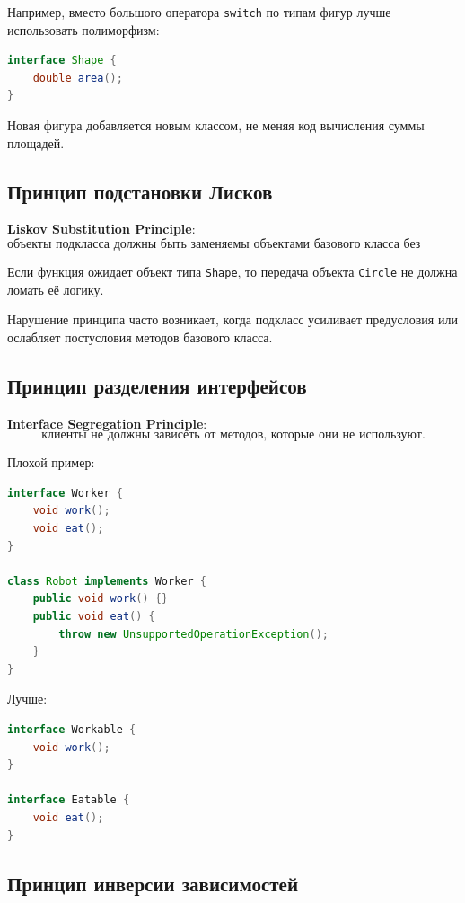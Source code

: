 \documentclass[12pt,a4paper]{article}
\begin{document}
Например, вместо большого оператора \texttt{switch} по типам фигур лучше использовать полиморфизм:

\begin{lstlisting}[language=Java]
interface Shape {
    double area();
}
\end{lstlisting}

Новая фигура добавляется новым классом, не меняя код вычисления суммы площадей.

\subsection{Принцип подстановки Лисков}

\textbf{Liskov Substitution Principle}:
\[
\text{объекты подкласса должны быть заменяемы объектами базового класса без нарушения корректности программы.}
\]

Если функция ожидает объект типа \texttt{Shape}, то передача объекта \texttt{Circle} не должна ломать её логику.

Нарушение принципа часто возникает, когда подкласс усиливает предусловия или ослабляет постусловия методов базового класса.

\subsection{Принцип разделения интерфейсов}

\textbf{Interface Segregation Principle}:
\[
\text{клиенты не должны зависеть от методов, которые они не используют.}
\]

Плохой пример:
\begin{lstlisting}[language=Java]
interface Worker {
    void work();
    void eat();
}

class Robot implements Worker {
    public void work() {}
    public void eat() {
        throw new UnsupportedOperationException();
    }
}
\end{lstlisting}

Лучше:
\begin{lstlisting}[language=Java]
interface Workable {
    void work();
}

interface Eatable {
    void eat();
}
\end{lstlisting}

\subsection{Принцип инверсии зависимостей}
\end{document}
